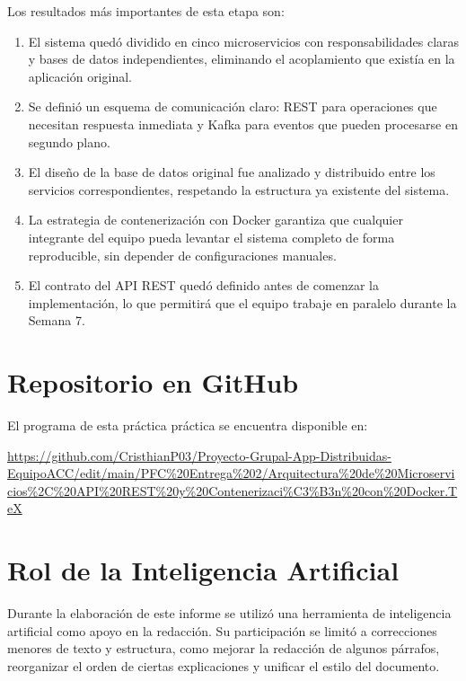 \documentclass[12pt, a4paper]{report}
\begin{document}
Los resultados más importantes de esta etapa son:

\begin{enumerate}
  \item El sistema quedó dividido en cinco microservicios con
        responsabilidades claras y bases de datos independientes,
        eliminando el acoplamiento que existía en la aplicación
        original.

  \item Se definió un esquema de comunicación claro: REST para
        operaciones que necesitan respuesta inmediata y Kafka para
        eventos que pueden procesarse en segundo plano.

  \item El diseño de la base de datos original fue analizado y
        distribuido entre los servicios correspondientes, respetando
        la estructura ya existente del sistema.

  \item La estrategia de contenerización con Docker garantiza que
        cualquier integrante del equipo pueda levantar el sistema
        completo de forma reproducible, sin depender de
        configuraciones manuales.

  \item El contrato del API REST quedó definido antes de comenzar
        la implementación, lo que permitirá que el equipo trabaje
        en paralelo durante la Semana 7.
\end{enumerate}

\newpage

\section{Repositorio en GitHub}

El programa de esta práctica práctica se encuentra disponible en:

\url{https://github.com/CristhianP03/Proyecto-Grupal-App-Distribuidas-EquipoACC/edit/main/PFC%20Entrega%202/Arquitectura%20de%20Microservicios%2C%20API%20REST%20y%20Contenerizaci%C3%B3n%20con%20Docker.TeX}


\section*{Rol de la Inteligencia Artificial}
Durante la elaboración de este informe se utilizó una herramienta de
inteligencia artificial como apoyo en la redacción. Su participación se limitó
a correcciones menores de texto y estructura, como mejorar la redacción de
algunos párrafos, reorganizar el orden de ciertas explicaciones y unificar
el estilo del documento.
\end{document}
